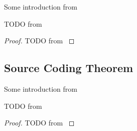 Some introduction from \cite{ElementsofInformationTheory}

\begin{theorem}\label{thm:kraft_inequality}
    TODO from \cite{ElementsofInformationTheory}
\end{theorem}
\begin{proof}
    TODO from \cite{ElementsofInformationTheory}
\end{proof}

\subsection{Source Coding Theorem}

Some introduction from \cite{ElementsofInformationTheory,Shannon1948,KolmogorovComplexity,han2002mathematics}

\begin{theorem}\label{thm:source_coding_theorem}
    TODO from \cite{ElementsofInformationTheory,han2002mathematics}
\end{theorem}
\begin{proof}
    TODO from \cite{ElementsofInformationTheory,han2002mathematics}
\end{proof}







\clearpage

